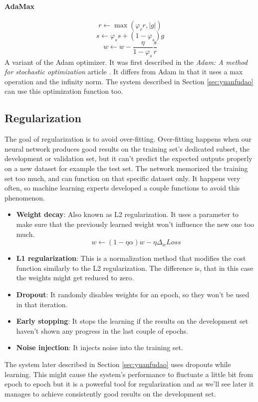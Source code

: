 \paragraph*{AdaMax}
\[r \leftarrow \max(\varphi_r r, |g|)\]
\[s \leftarrow \varphi_s s + (1 - \varphi_s) g\]
\[w \leftarrow w - \frac{\eta}{1 - \varphi_s}\frac{s}{r}\]
A variant of the Adam optimizer. It was first described in the \textit{Adam: A method for stochastic optimization} article \cite{Kingma:2015}. It differs from Adam in that it uses a max operation and the infinity norm. The system described in Section \ref{sec:yuanfudao} can use this optimization function too.

\subsection{Regularization}
The goal of regularization is to avoid over-fitting. Over-fitting happens when our neural network produces good results on the training set's dedicated subset, the development or validation set, but it can't predict the expected outputs properly on a new dataset for example the test set. The network memorized the training set too much, and can function on that specific dataset only. It happens very often, so machine learning experts developed a couple functions to avoid this phenomenon.
\begin{itemize}
	\item \textbf{Weight decay}: Also known as L2 regularization. It uses a parameter to make sure that the previously learned weight won't influence the new one too much. \[w \leftarrow (1 - \eta \alpha)w - \eta \Delta_w Loss\]
	\item \textbf{L1 regularization}: This is a normalization method that modifies the cost function similarly to the L2 regularization. The difference is, that in this case the weights might get reduced to zero.
	\item \textbf{Dropout}: It randomly disables weights for an epoch, so they won't be used in that iteration.
	\item \textbf{Early stopping}: It stops the learning if the results on the development set haven't shown any progress in the last couple of epochs.
	\item \textbf{Noise injection}: It injects noise into the training set.
\end{itemize}

The system later described in Section \ref{sec:yuanfudao} uses dropouts while learning. This might cause the system's performance to fluctuate a little bit from epoch to epoch but it is a powerful tool for regularization and as we'll see later it manages to achieve consistently good results on the development set.

